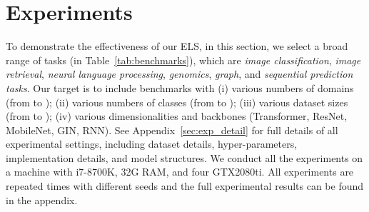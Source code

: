 \documentclass{article} \usepackage{iclr2023_conference,times}
\newcommand{\ls}[0]{ELS\xspace}
\begin{document}
\vspace{-0.15cm}
\section{Experiments}\label{sec:exps}
\vspace{-0.15cm}

To demonstrate the effectiveness of our \ls, in this section, we select a broad range of tasks (in Table~\ref{tab:benchmarks}), which are \textit{image classification}, \textit{image retrieval}, \textit{neural language processing}, \textit{genomics}, \textit{graph}, and \textit{sequential prediction tasks}. Our target is to include benchmarks with (i) various numbers of domains (from  to ); (ii) various numbers of classes (from  to ); (iii) various dataset sizes (from  to ); (iv) various dimensionalities and backbones (Transformer, ResNet, MobileNet, GIN, RNN). See Appendix~\ref{sec:exp_detail} for full details of all experimental settings, including dataset details, hyper-parameters, implementation details, and model structures. We conduct all the experiments on a machine with i7-8700K, 32G RAM, and four GTX2080ti. All experiments are repeated  times with different seeds and the full experimental results can be found in the appendix.
\end{document}
